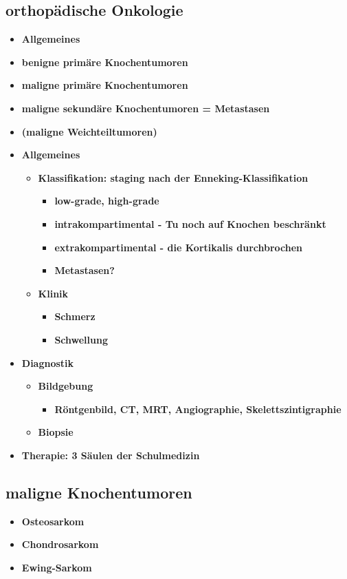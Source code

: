 \subsection{orthopädische Onkologie}
	\begin{itemize}
		\item \textbf{Allgemeines}
		\item \textbf{benigne primäre Knochentumoren}
		\item \textbf{maligne primäre Knochentumoren}
		\item \textbf{maligne sekundäre Knochentumoren = Metastasen}
		\item \textbf{(maligne Weichteiltumoren)}
		\item \textbf{Allgemeines}
			\begin{itemize}
				\item \textbf{Klassifikation: staging nach der Enneking-Klassifikation}
					\begin{itemize}
						\item \textbf{low-grade, high-grade}
						\item \textbf{intrakompartimental - Tu noch auf Knochen beschränkt}
						\item \textbf{extrakompartimental - die Kortikalis durchbrochen}
						\item \textbf{Metastasen?}
					\end{itemize}
				\item \textbf{Klinik}
					\begin{itemize}
						\item \textbf{Schmerz}
						\item \textbf{Schwellung}
					\end{itemize}
			\end{itemize}
		\item \textbf{Diagnostik}
			\begin{itemize}
				\item \textbf{Bildgebung}
					\begin{itemize}
						\item \textbf{Röntgenbild, CT, MRT, Angiographie, Skelettszintigraphie}
					\end{itemize}
				\item \textbf{Biopsie}
			\end{itemize}
		\item \textbf{Therapie: 3 Säulen der Schulmedizin}
 	\end{itemize}

\subsection{maligne Knochentumoren}
	\begin{itemize}
		\item \textbf{Osteosarkom}
		\item \textbf{Chondrosarkom}
		\item \textbf{Ewing-Sarkom}
 	\end{itemize}